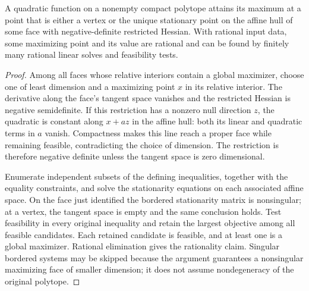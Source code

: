 \begin{lemma}\label{lem:faces}
A quadratic function on a nonempty compact polytope attains its maximum at a point that is either a vertex or the unique stationary point on the affine hull of some face with negative-definite restricted Hessian. With rational input data, some maximizing point and its value are rational and can be found by finitely many rational linear solves and feasibility tests.
\end{lemma}
\begin{proof}
Among all faces whose relative interiors contain a global maximizer, choose one of least dimension and a maximizing point $x$ in its relative interior. The derivative along the face's tangent space vanishes and the restricted Hessian is negative semidefinite. If this restriction has a nonzero null direction $z$, the quadratic is constant along $x+az$ in the affine hull: both its linear and quadratic terms in $a$ vanish. Compactness makes this line reach a proper face while remaining feasible, contradicting the choice of dimension. The restriction is therefore negative definite unless the tangent space is zero dimensional.

Enumerate independent subsets of the defining inequalities, together with the equality constraints, and solve the stationarity equations on each associated affine space. On the face just identified the bordered stationarity matrix is nonsingular; at a vertex, the tangent space is empty and the same conclusion holds. Test feasibility in every original inequality and retain the largest objective among all feasible candidates. Each retained candidate is feasible, and at least one is a global maximizer. Rational elimination gives the rationality claim. Singular bordered systems may be skipped because the argument guarantees a nonsingular maximizing face of smaller dimension; it does not assume nondegeneracy of the original polytope.
\end{proof}

